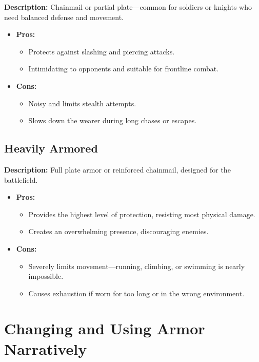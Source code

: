 \documentclass[12pt]{book}  %
\begin{document}
\textbf{Description:} Chainmail or partial plate—common for soldiers or knights who need balanced defense and movement.

\begin{itemize}
    \item \textbf{Pros:}
    \begin{itemize}
        \item Protects against slashing and piercing attacks.
        \item Intimidating to opponents and suitable for frontline combat.
    \end{itemize}
    \item \textbf{Cons:}
    \begin{itemize}
        \item Noisy and limits stealth attempts.
        \item Slows down the wearer during long chases or escapes.
    \end{itemize}
\end{itemize}

\subsection*{Heavily Armored}

\textbf{Description:} Full plate armor or reinforced chainmail, designed for the battlefield.

\begin{itemize}
    \item \textbf{Pros:}
    \begin{itemize}
        \item Provides the highest level of protection, resisting most physical damage.
        \item Creates an overwhelming presence, discouraging enemies.
    \end{itemize}
    \item \textbf{Cons:}
    \begin{itemize}
        \item Severely limits movement—running, climbing, or swimming is nearly impossible.
        \item Causes exhaustion if worn for too long or in the wrong environment.
    \end{itemize}
\end{itemize}

\section{Changing and Using Armor Narratively}
\end{document}
